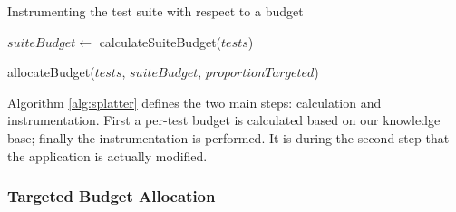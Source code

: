 \begin{algorithm}[h]
\caption{Instrumenting the test suite with respect to a budget}
\label{alg:splatter}
\begin{algorithmic}
	\Statex


	\State $suiteBudget \gets$ calculateSuiteBudget($tests$)
	\Statex

	\State allocateBudget($tests$, $suiteBudget$, $proportionTargeted$)
	\Statex

	\EndFor

	\EndFunction

	\Statex


	\Statex


	\EndFunction
\end{algorithmic}
\end{algorithm}

Algorithm \ref{alg:splatter} defines the two main steps: calculation and instrumentation. First a per-test budget is calculated based on our knowledge base; finally the instrumentation is performed. It is during the second step that the application is actually modified.


\subsubsection{Targeted Budget Allocation}

